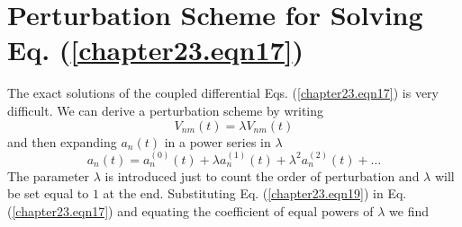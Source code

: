 \section{Perturbation Scheme for Solving Eq. (\ref{chapter23.eqn17})}
The exact solutions of the coupled differential Eqs. (\ref{chapter23.eqn17}) is very difficult. We can derive a perturbation scheme by writing
\begin{equation}
V_{n m}(t) = \lambda V_{n m}(t)
\end{equation}
and then expanding $a_n(t)$ in a power series in $\lambda$
\begin{equation}
\label{chapter23.eqn19}
a_n(t) = a_n^{(0)}(t) + \lambda a^{(1)}_n (t) + \lambda^2 a^{(2)}_n (t) + \ldots
\end{equation}
The parameter $\lambda$ is introduced just to count the order of perturbation and $\lambda$ will be set equal to $1$ at the end. Substituting Eq. (\ref{chapter23.eqn19}) in Eq. (\ref{chapter23.eqn17}) and equating the coefficient of equal powers of $\lambda$ we find

